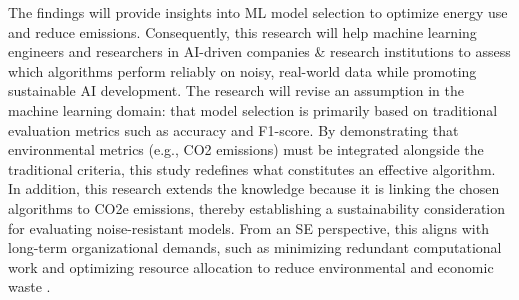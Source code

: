 \documentclass[conference]{IEEEtran}
\begin{document}
\newline
\newline
The findings will provide insights into ML model selection to optimize energy use and reduce emissions. Consequently, this research will help machine learning engineers and researchers in AI-driven companies \& research institutions to assess which algorithms perform reliably on noisy, real-world data while promoting sustainable AI development.
\newline
\newline
The research will revise an assumption in the machine learning domain: that model selection is primarily based on traditional evaluation metrics such as accuracy and F1-score.  By demonstrating that environmental metrics (e.g., CO2 emissions) must be integrated alongside the traditional criteria, this study redefines what constitutes an effective algorithm. In addition, this research extends the knowledge because it is linking the chosen algorithms to CO2e emissions, thereby establishing a sustainability consideration for evaluating noise-resistant models. From an SE perspective, this aligns with long-term organizational demands, such as minimizing redundant computational work and optimizing resource allocation to reduce environmental and economic waste \cite[pp. 290-291]{sweb}.

\end{document}
